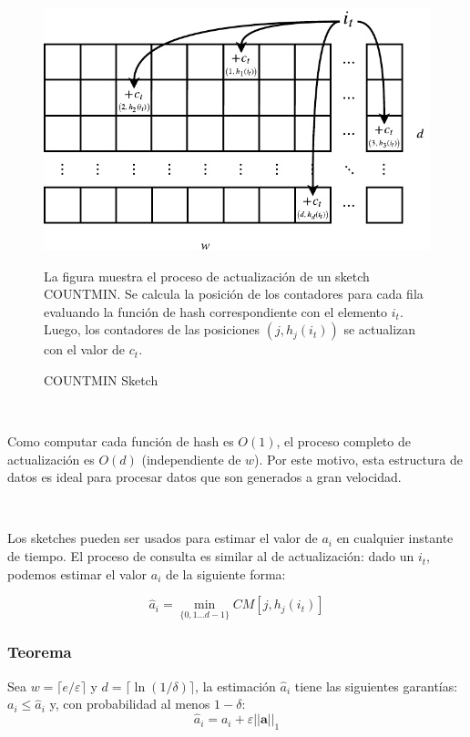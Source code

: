 \documentclass[a4paper,12pt, oneside]{article}
\begin{document}
\begin{figure}[ht]
	\centering
	\includegraphics[width=1\textwidth]{./graph/cm_sketch.pdf}
	\caption{COUNTMIN Sketch}
	\label{fig:cm_sketch}
	\medskip
	\small
	
	\parbox{13.1cm}{La figura muestra el proceso de actualización de un sketch COUNTMIN. Se calcula la posición de los contadores para cada fila evaluando la función de hash correspondiente con el elemento $i_t$. Luego, los contadores de las posiciones $(j, h_j(i_t))$ se actualizan con el valor de $c_t$.}
	
\end{figure}

\

Como computar cada función de hash es $O(1)$, el proceso completo de actualización es $O(d)$ (independiente de $w$). Por este motivo, esta estructura de datos es ideal para procesar datos que son generados a gran velocidad.

\

Los sketches pueden ser usados para estimar el valor de $a_i$ en cualquier instante de tiempo. El proceso de consulta es similar al de actualización: dado un $i_t$, podemos estimar el valor $a_i$ de la siguiente forma:

\begin{equation}
	\hat{a}_i = \min_{\{0,1  \dots d-1 \}}CM[j, h_j(i_t)]
\end{equation}

\subsubsection*{Teorema} Sea $w=\lceil e / \varepsilon \rceil$ y $d=\lceil \ln (1 / \delta) \rceil$, la estimación $\hat{a}_i$ tiene las siguientes garantías: $a_i \leq \hat{a}_i$ y, con probabilidad al menos $1-\delta$:
\begin{equation}
	\hat{a}_i = a_i + \varepsilon ||\mathbf{a}||_1
\end{equation}
\end{document}
